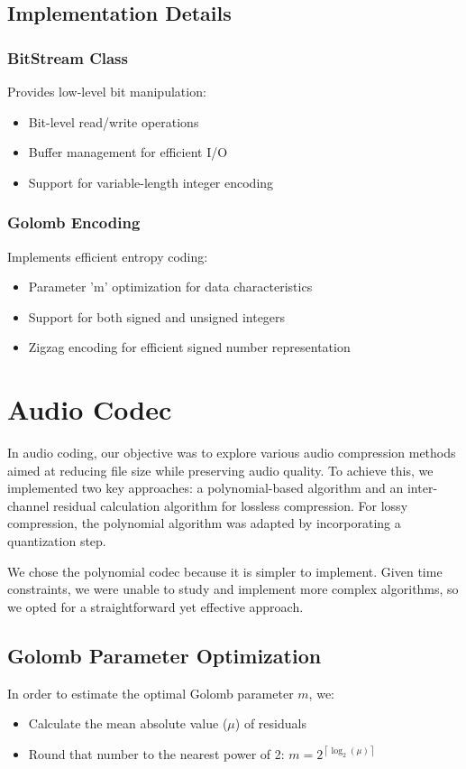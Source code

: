 \documentclass[a4paper,14pt]{article}
\begin{document}
\subsection{Implementation Details}

\subsubsection{BitStream Class}
Provides low-level bit manipulation:
\begin{itemize}
    \item Bit-level read/write operations
    \item Buffer management for efficient I/O
    \item Support for variable-length integer encoding
\end{itemize}

\subsubsection{Golomb Encoding}
Implements efficient entropy coding:
\begin{itemize}
    \item Parameter 'm' optimization for data characteristics
    \item Support for both signed and unsigned integers
    \item Zigzag encoding for efficient signed number representation
\end{itemize}

\section{Audio Codec}
In audio coding, our objective was to explore various audio compression methods aimed at reducing file size while preserving audio quality. To achieve this, we implemented two key approaches: a polynomial-based algorithm and an inter-channel residual calculation algorithm for lossless compression. For lossy compression, the polynomial algorithm was adapted by incorporating a quantization step.

We chose the polynomial codec because it is simpler to implement. Given time constraints, we were unable to study and implement more complex algorithms, so we opted for a straightforward yet effective approach.

\subsection{Golomb Parameter Optimization}
In order to estimate the optimal Golomb parameter $m$, we:
    \begin{itemize}
        \item Calculate the mean absolute value ($\mu$) of residuals
        \item Round that number to the nearest power of 2: $ m = 2^{\left\lceil {\log_2(\mu)} \right\rceil}$
    \end{itemize}
\end{document}
